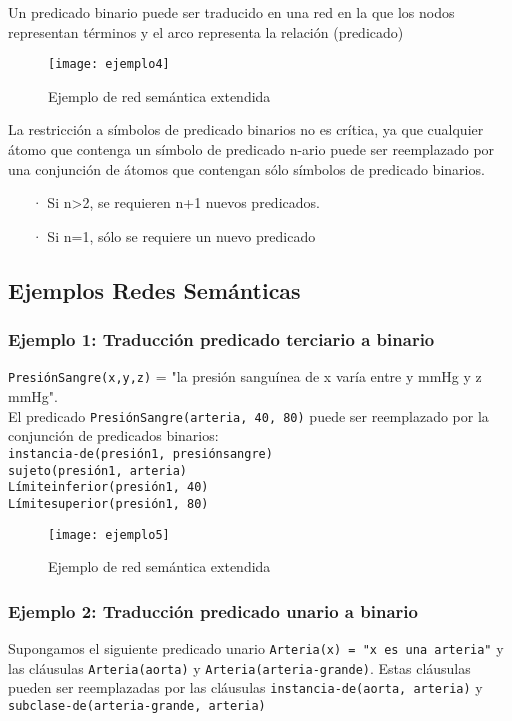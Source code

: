 \documentclass[12pt]{article}
\begin{document}
Un predicado binario puede ser traducido en una red en la que los nodos representan términos y el arco representa la relación (predicado)

\begin{figure}[H]
\centering
\texttt{[image: ejemplo4]}
\caption{Ejemplo de red semántica extendida} \label{fig:ejemplo4}
\end{figure}

La restricción a símbolos de predicado binarios no es crítica, ya que cualquier átomo que contenga un símbolo de predicado n-ario puede ser reemplazado por una conjunción de átomos que contengan sólo símbolos de predicado binarios.
\begin{enumerate}
\item[·] Si n>2, se requieren n+1 nuevos predicados.
\item[·] Si n=1, sólo se requiere un nuevo predicado
\end{enumerate}
\subsection{Ejemplos Redes Semánticas}
\subsubsection{Ejemplo 1: Traducción predicado terciario a binario}
\texttt{PresiónSangre(x,y,z)} = "la presión sanguínea de x varía entre y mmHg y z mmHg".\\
El predicado \texttt{PresiónSangre(arteria, 40, 80)} puede ser reemplazado por la conjunción de predicados binarios:\\
\texttt{instancia-de(presión1, presiónsangre)}\\
\texttt{sujeto(presión1, arteria)}\\
\texttt{Límiteinferior(presión1, 40)}\\
\texttt{Límitesuperior(presión1, 80)}\\

\begin{figure}[H]
\centering
\texttt{[image: ejemplo5]}
\caption{Ejemplo de red semántica extendida} \label{fig:ejemplo5}
\end{figure}

\subsubsection{Ejemplo 2: Traducción predicado unario a binario}
Supongamos el siguiente predicado unario \texttt{Arteria(x) = "x es una arteria"} y las cláusulas \texttt{Arteria(aorta)} y \texttt{Arteria(arteria-grande)}. Estas cláusulas pueden ser reemplazadas por las cláusulas \texttt{instancia-de(aorta, arteria)} y \texttt{subclase-de(arteria-grande, arteria)}
\end{document}
